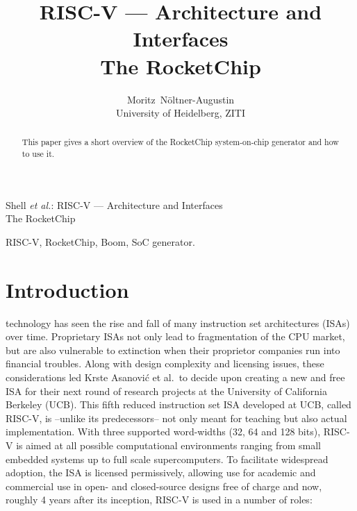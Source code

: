 \documentclass[journal,a4paper]{IEEEtran}
\def\krste/{Krste Asanovi\'c}
\begin{document}


\title{RISC-V --- Architecture and Interfaces\\The RocketChip}


\author{Moritz~N\"oltner-Augustin\\%
University of Heidelberg, ZITI}

%
{Shell \MakeLowercase{\textit{et al.}}: RISC-V --- Architecture and Interfaces\\The RocketChip}

\maketitle

\begin{abstract}
	This paper gives a short overview of the RocketChip system-on-chip generator and how to use it.
\end{abstract}

\begin{IEEEkeywords}
	RISC-V, RocketChip, Boom, SoC generator.
\end{IEEEkeywords}


\section{Introduction}
 technology has seen the rise and fall of many instruction set architectures (ISAs) over time.
Proprietary ISAs not only lead to fragmentation of the CPU market, but are also vulnerable to extinction when their proprietor companies run into financial troubles.
Along with design complexity and licensing issues, these considerations led \krste/ et al.\ to decide upon creating a new and free ISA for their next round of research projects at the University of California Berkeley (UCB).
This fifth reduced instruction set ISA developed at UCB, called RISC-V, is --unlike its predecessors-- not only meant for teaching but also actual implementation.
With three supported word-widths (32, 64 and 128 bits), RISC-V is aimed at all possible computational environments ranging from small embedded systems up to full scale supercomputers.
To facilitate widespread adoption, the ISA is licensed permissively, allowing use for academic and commercial use in open- and closed-source designs free of charge and now, roughly 4 years after its inception, RISC-V is used in a number of roles:
\end{document}
